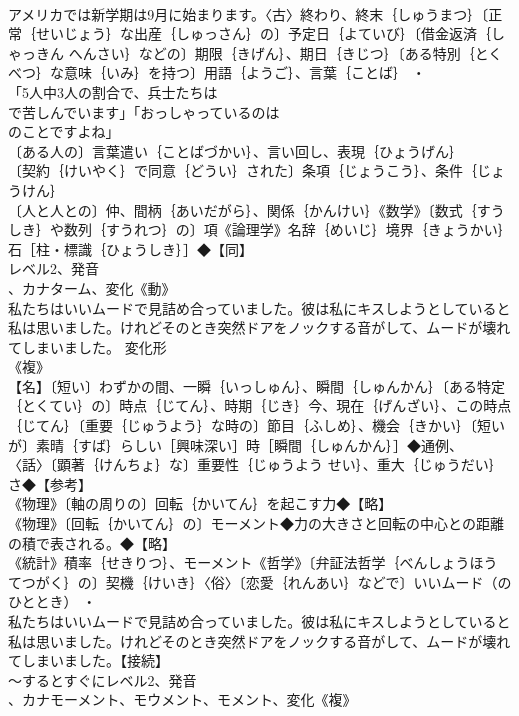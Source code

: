 \documentclass[8pt]{extreport}
\begin{document}
\begin{CJK}{UTF8}{min}
\\	アメリカでは新学期は9月に始まります。〈古〉終わり、終末｛しゅうまつ｝〔正常｛せいじょう｝な出産｛しゅっさん｝の〕予定日｛よていび｝〔借金返済｛しゃっきん へんさい｝などの〕期限｛きげん｝、期日｛きじつ｝〔ある特別｛とくべつ｝な意味｛いみ｝を持つ〕用語｛ようご｝、言葉｛ことば｝ ・
\\	「5人中3人の割合で、兵士たちは
\\	で苦しんでいます」「おっしゃっているのは
\\	のことですよね」
\\	〔ある人の〕言葉遣い｛ことばづかい｝、言い回し、表現｛ひょうげん｝
\\	〔契約｛けいやく｝で同意｛どうい｝された〕条項｛じょうこう｝、条件｛じょうけん｝
\\	〔人と人との〕仲、間柄｛あいだがら｝、関係｛かんけい｝《数学》〔数式｛すうしき｝や数列｛すうれつ｝の〕項《論理学》名辞｛めいじ｝境界｛きょうかい｝石［柱・標識｛ひょうしき｝］◆【同】
\\	レベル2、発音
\\	、カナターム、変化《動》
\\	私たちはいいムードで見詰め合っていました。彼は私にキスしようとしていると私は思いました。けれどそのとき突然ドアをノックする音がして、ムードが壊れてしまいました。	変化形 
\\	《複》
\\	【名】〔短い〕わずかの間、一瞬｛いっしゅん｝、瞬間｛しゅんかん｝〔ある特定｛とくてい｝の〕時点｛じてん｝、時期｛じき｝今、現在｛げんざい｝、この時点｛じてん｝〔重要｛じゅうよう｝な時の〕節目｛ふしめ｝、機会｛きかい｝〔短いが〕素晴｛すば｝らしい［興味深い］時［瞬間｛しゅんかん｝］◆通例、
\\	〈話〉〔顕著｛けんちょ｝な〕重要性｛じゅうよう せい｝、重大｛じゅうだい｝さ◆【参考】
\\	《物理》〔軸の周りの〕回転｛かいてん｝を起こす力◆【略】
\\	《物理》〔回転｛かいてん｝の〕モーメント◆力の大きさと回転の中心との距離の積で表される。◆【略】
\\	《統計》積率｛せきりつ｝、モーメント《哲学》〔弁証法哲学｛べんしょうほう てつがく｝の〕契機｛けいき｝〈俗〉〔恋愛｛れんあい｝などで〕いいムード（のひととき） ・
\\	私たちはいいムードで見詰め合っていました。彼は私にキスしようとしていると私は思いました。けれどそのとき突然ドアをノックする音がして、ムードが壊れてしまいました。【接続】
\\	～するとすぐにレベル2、発音
\\	、カナモーメント、モウメント、モメント、変化《複》

\end{CJK}
\end{document}
